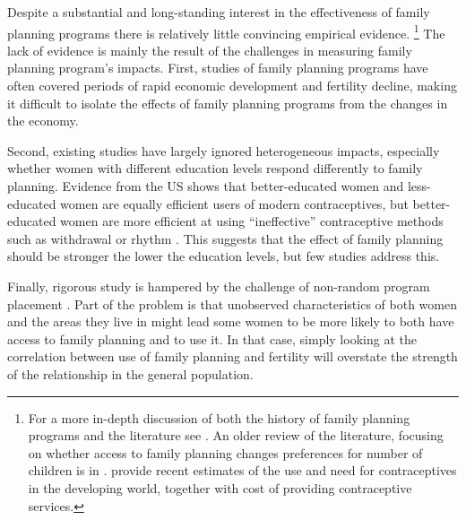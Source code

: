 \documentclass[letterpaper,12pt]{article}
\begin{document}

Despite a substantial and long-standing interest in the effectiveness 
of family planning programs there is relatively little convincing 
empirical evidence.%
\footnote{
For a more in-depth discussion of both the history of family planning
programs and the literature see \citet{Miller2016}.
An older review of the literature, focusing on whether access to
family planning changes preferences for number of children is
in \citet{Freedman1997}.
\citet{Singh2012} provide recent estimates of the use and need for
contraceptives in the developing world, together with cost of 
providing contraceptive services.
}
The lack of evidence is mainly the result of the challenges in measuring 
family planning program's impacts.
First, studies of family planning programs have often covered periods of 
rapid economic development and fertility decline, making it difficult to
isolate the effects of family planning programs from the changes in the
economy.

Second, existing studies have largely ignored heterogeneous impacts,
especially whether women with different education levels respond
differently to family planning.
Evidence from the US shows that better-educated women and less-educated
women are equally efficient users of modern contraceptives, but
better-educated women are more efficient at using ``ineffective'' 
contraceptive methods such as withdrawal or rhythm \citep{Rosenzweig1989}.
This suggests that the effect of family planning should be stronger the 
lower the education levels, but few studies address this.

Finally, rigorous study is hampered by the challenge of non-random program 
placement \citep{rosenzweig86,pitt93}.
Part of the problem is that unobserved characteristics of both women
and the areas they live in might lead some women to be more likely to
both have access to family planning and to use it.
In that case, simply looking at the correlation between use of family
planning and fertility will overstate the strength of the relationship
in the general population.
\end{document}
